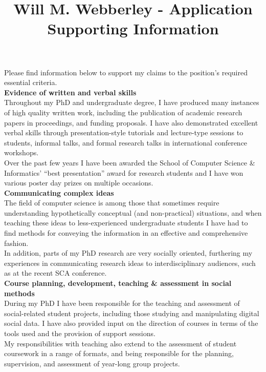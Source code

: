 \documentclass[11pt,a4paper]{article}
\title{Will M. Webberley - Application Supporting Information}
\date{}
\begin{document}
\maketitle
Please find information below to support my claims to the position's required essential criteria.\\

\textbf{Evidence of written and verbal skills}\\
Throughout my PhD and undergraduate degree, I have produced many instances of high quality written work, including the publication of academic research papers in proceedings, and funding proposals. I have also demonstrated excellent verbal skills through presentation-style tutorials and lecture-type sessions to students, informal talks, and formal research talks in international conference workshops.\\
Over the past few years I have been awarded the School of Computer Science \& Informatics' ``best presentation'' award for research students and I have won various poster day prizes on multiple occasions.\\

\textbf{Communicating complex ideas}\\
The field of computer science is among those that sometimes require understanding hypothetically conceptual (and non-practical) situations, and when teaching these ideas to less-experienced undergraduate students I have had to find methods for conveying the information in an effective and comprehensive fashion.\\
In addition, parts of my PhD research are very socially oriented, furthering my experiences in communicating research ideas to interdisciplinary audiences, such as at the recent SCA conference.\\

\textbf{Course planning, development, teaching \& assessment in social methods}\\
During my PhD I have been responsible for the teaching and assessment of social-related student projects, including those studying and manipulating digital social data. I have also provided input on the direction of courses in terms of the tools used and the provision of support sessions.\\
My responsibilities with teaching also extend to the assessment of student coursework in a range of formats, and being responsible for the planning, supervision, and assessment of year-long group projects.\\
\end{document}

